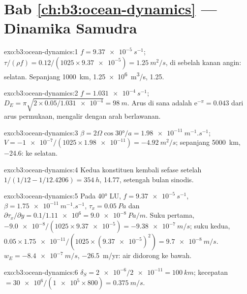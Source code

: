 \section*{Bab \ref{ch:b3:ocean-dynamics} --- Dinamika Samudra}

\begin{solution}{exo:b3:ocean-dynamics:1}
$f = \qty{9.37e-5}{s^{-1}}$; $\tau/(\rho f) = 0.12/(1025\times\num{9.37e-5})
= \qty{1.25}{m^2/s}$, di sebelah kanan angin: selatan. Sepanjang
\qty{1000}{km}, \qty{1.25e6}{m^3/s}, \qty{1.25}{\sverdrup}.
\end{solution}

\begin{solution}{exo:b3:ocean-dynamics:2}
$f = \qty{1.031e-4}{s^{-1}}$; $D_E = \pi\sqrt{2\times0.05/\num{1.031e-4}}
= \qty{98}{m}$. Arus di sana adalah $\mathrm e^{-\pi} = \num{0.043}$ dari
arus permukaan, mengalir dengan arah berlawanan.
\end{solution}

\begin{solution}{exo:b3:ocean-dynamics:3}
$\beta = 2\Omega\cos\ang{30}/a = \qty{1.98e-11}{m^{-1}.s^{-1}}$; $V =
\num{-1e-7}/(1025\times\num{1.98e-11}) = \qty{-4.92}{m^2/s}$; sepanjang
\qty{5000}{km}, \qty{-24.6}{\sverdrup}: ke selatan.
\end{solution}

\begin{solution}{exo:b3:ocean-dynamics:4}
Kedua konstituen kembali sefase setelah $1/(1/12 - 1/12.4206) =
\qty{354}{h}$, \num{14.77}, setengah bulan sinodis.
\end{solution}

\begin{solution}{exo:b3:ocean-dynamics:5}
Pada \ang{40} LU, $f = \qty{9.37e-5}{s^{-1}}$, $\beta =
\qty{1.75e-11}{m^{-1}.s^{-1}}$, $\tau_x = \qty{0.05}{Pa}$ dan
$\partial\tau_x/\partial y = 0.1/\num{1.11e6} = \qty{9.0e-8}{Pa/m}$. Suku
pertama, $-\num{9.0e-8}/(1025\times\num{9.37e-5}) =
\qty{-9.38e-7}{m/s}$; suku kedua, $0.05\times\num{1.75e-11}/(1025\times
(\num{9.37e-5})^2) = \qty{+9.7e-8}{m/s}$. $w_E = \qty{-8.4e-7}{m/s}$,
\qty{-26.5}{m/yr}: air didorong ke bawah.
\end{solution}

\begin{solution}{exo:b3:ocean-dynamics:6}
$\delta_S = \num{2e-6}/\num{2e-11} = \qty{100}{km}$; kecepatan $=
\num{30e6}/(\num{1e5}\times800) = \qty{0.375}{m/s}$.
\end{solution}

